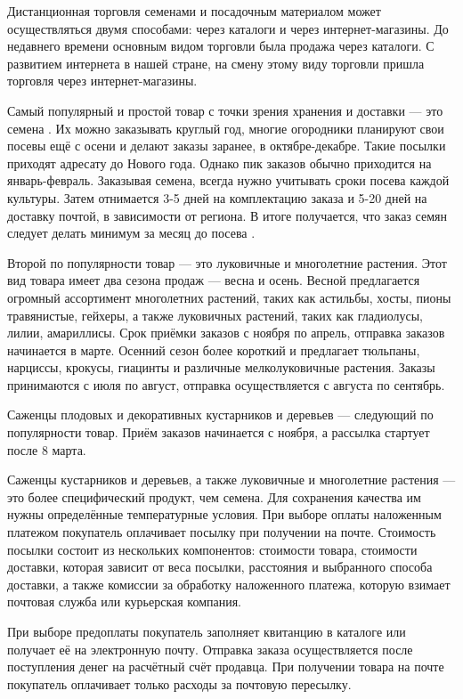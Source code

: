 Дистанционная торговля семенами и посадочным материалом может осуществляться двумя способами: через каталоги и через интернет-магазины. До недавнего времени основным видом торговли была продажа через каталоги. С развитием интернета в нашей стране, на смену этому виду торговли пришла торговля через интернет-магазины.

Самый популярный и простой товар с точки зрения хранения и доставки — это семена \cite{krivko}. Их можно заказывать круглый год, многие огородники планируют свои посевы ещё с осени и делают заказы заранее, в октябре-декабре. Такие посылки приходят адресату до Нового года. Однако пик заказов обычно приходится на январь-февраль. Заказывая семена, всегда нужно учитывать сроки посева каждой культуры. Затем отнимается 3-5 дней на комплектацию заказа и 5-20 дней на доставку почтой, в зависимости от региона. В итоге получается, что заказ семян следует делать минимум за месяц до посева \cite{kaygorodtseva}.

Второй по популярности товар — это луковичные и многолетние растения. Этот вид товара имеет два сезона продаж — весна и осень. Весной предлагается огромный ассортимент многолетних растений, таких как астильбы, хосты, пионы травянистые, гейхеры, а также луковичных растений, таких как гладиолусы, лилии, амариллисы. Срок приёмки заказов с ноября по апрель, отправка заказов начинается в марте. Осенний сезон более короткий и предлагает тюльпаны, нарциссы, крокусы, гиацинты и различные мелколуковичные растения. Заказы принимаются с июля по август, отправка осуществляется с августа по сентябрь.

Саженцы плодовых и декоративных кустарников и деревьев — следующий по популярности товар. Приём заказов начинается с ноября, а рассылка стартует после 8 марта.

Саженцы кустарников и деревьев, а также луковичные и многолетние растения — это более специфический продукт, чем семена. Для сохранения качества им нужны определённые температурные условия.
При выборе оплаты наложенным платежом покупатель оплачивает посылку при получении на почте. Стоимость посылки состоит из нескольких компонентов: стоимости товара, стоимости доставки, которая зависит от веса посылки, расстояния и выбранного способа доставки, а также комиссии за обработку наложенного платежа, которую взимает почтовая служба или курьерская компания.

При выборе предоплаты покупатель заполняет квитанцию в каталоге или получает её на электронную почту. Отправка заказа осуществляется после поступления денег на расчётный счёт продавца. При получении товара на почте покупатель оплачивает только расходы за почтовую пересылку.

